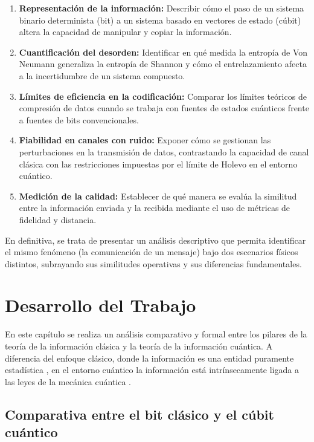 \documentclass[11pt,a4paper,spanish]{book}
\begin{document}
\begin{enumerate}
    \item \textbf{Representación de la información:} Describir cómo el paso de un sistema binario determinista (bit) a un sistema basado en vectores de estado (cúbit) altera la capacidad de manipular y copiar la información.
    \item \textbf{Cuantificación del desorden:} Identificar en qué medida la entropía de Von Neumann generaliza la entropía de Shannon y cómo el entrelazamiento afecta a la incertidumbre de un sistema compuesto.
    \item \textbf{Límites de eficiencia en la codificación:} Comparar los límites teóricos de compresión de datos cuando se trabaja con fuentes de estados cuánticos frente a fuentes de bits convencionales.
    \item \textbf{Fiabilidad en canales con ruido:} Exponer cómo se gestionan las perturbaciones en la transmisión de datos, contrastando la capacidad de canal clásica con las restricciones impuestas por el límite de Holevo en el entorno cuántico.
    \item \textbf{Medición de la calidad:} Establecer de qué manera se evalúa la similitud entre la información enviada y la recibida mediante el uso de métricas de fidelidad y distancia.
\end{enumerate}

En definitiva, se trata de presentar un análisis descriptivo que permita identificar el mismo fenómeno (la comunicación de un mensaje) bajo dos escenarios físicos distintos, subrayando sus similitudes operativas y sus diferencias fundamentales.

\chapter{Desarrollo del Trabajo}

En este capítulo se realiza un análisis comparativo y formal entre los pilares de la teoría de la información clásica y la teoría de la información cuántica. A diferencia del enfoque clásico, donde la información es una entidad puramente estadística \citep{shannon1948}, en el entorno cuántico la información está intrínsecamente ligada a las leyes de la mecánica cuántica \citep{landauer1991}.

\section{Comparativa entre el bit clásico y el cúbit cuántico}
\end{document}
